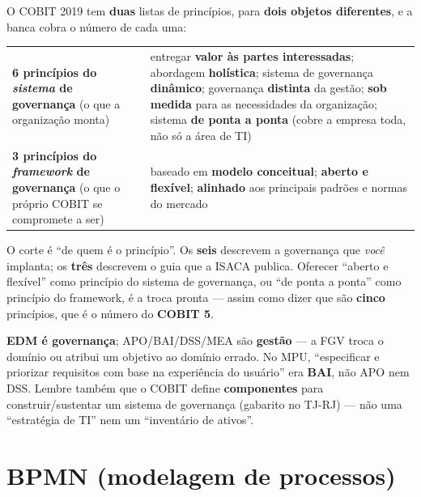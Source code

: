 \begin{conceito}
O COBIT 2019 tem \textbf{duas} listas de princípios, para \textbf{dois objetos
diferentes}, e a banca cobra o número de cada uma:

\begin{center}
\begin{tabular}{@{}p{4.2cm}p{7.4cm}@{}}
\toprule
\textbf{6 princípios do \emph{sistema} de governança} (o que a organização
monta) & entregar \textbf{valor às partes interessadas}; abordagem
\textbf{holística}; sistema de governança \textbf{dinâmico}; governança
\textbf{distinta} da gestão; \textbf{sob medida} para as necessidades da
organização; sistema \textbf{de ponta a ponta} (cobre a empresa toda, não só a
área de TI) \\
\addlinespace
\textbf{3 princípios do \emph{framework} de governança} (o que o próprio COBIT
se compromete a ser) & baseado em \textbf{modelo conceitual}; \textbf{aberto e
flexível}; \textbf{alinhado} aos principais padrões e normas do mercado \\
\bottomrule
\end{tabular}
\end{center}

O corte é ``de quem é o princípio''. Os \textbf{seis} descrevem a governança
que \emph{você} implanta; os \textbf{três} descrevem o guia que a ISACA
publica. Oferecer ``aberto e flexível'' como princípio do sistema de
governança, ou ``de ponta a ponta'' como princípio do framework, é a troca
pronta --- assim como dizer que são \textbf{cinco} princípios, que é o número
do \textbf{COBIT 5}.
\end{conceito}

\begin{pegadinha}
\textbf{EDM é governança}; APO/BAI/DSS/MEA são \textbf{gestão} --- a FGV troca
o domínio ou atribui um objetivo ao domínio errado. No MPU, ``especificar e
priorizar requisitos com base na experiência do usuário'' era \textbf{BAI},
não APO nem DSS. Lembre também que o COBIT define \textbf{componentes} para
construir/sustentar um sistema de governança (gabarito no TJ-RJ) --- não uma
``estratégia de TI'' nem um ``inventário de ativos''.
\end{pegadinha}

\section{BPMN (modelagem de processos)}

